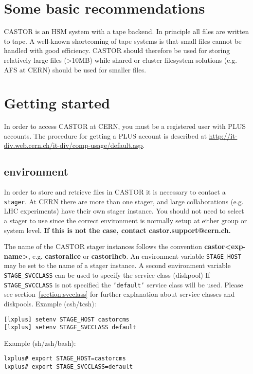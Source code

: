\section{Some basic recommendations}
CASTOR is an HSM system with a tape backend. In principle all files are written to tape. A
well-known shortcoming of tape systems is that small files cannot be handled with good efficiency.
CASTOR should therefore be used for storing relatively large files (>10MB) while shared or cluster
filesystem solutions (e.g. AFS at CERN) should be used for smaller files.

\section{Getting started}
In order to access CASTOR at CERN, you must be a registered user with PLUS accounts. The procedure
for getting a PLUS account is described at \url{http://it-div.web.cern.ch/it-div/comp-usage/default.asp}.

\subsection{environment}
\label{overview:environment}
In order to store and retrieve files in CASTOR it is necessary to contact a {\tt stager}.
At CERN there are more than one stager, and large collaborations (e.g. LHC experiments) have
their own stager instance. You should not need to select a stager to use since the correct
environment is normally setup at either group or system level.
{\bf If this is not the case, contact castor.support@cern.ch.}

The name of the CASTOR stager instances follows the convention {\bf castor<exp-name>}, e.g.
{\bf castoralice} or {\bf castorlhcb}. An environment variable {\tt STAGE\_HOST} may be set
to the name of a stager instance.
A second environment variable {\tt STAGE\_SVCCLASS} can be used to specify the service class (diskpool)
If {\tt STAGE\_SVCCLASS} is not specified the {\tt 'default'} service class will be used.
Please see section~\ref{section:svcclass} for further explanation about service classes and diskpools.
Example (csh/tcsh):
\small
\begin{verbatim}
[lxplus] setenv STAGE_HOST castorcms
[lxplus] setenv STAGE_SVCCLASS default
\end{verbatim}
\normalsize
Example (sh/zsh/bash):
\small
\begin{verbatim}
lxplus# export STAGE_HOST=castorcms
lxplus# export STAGE_SVCCLASS=default
\end{verbatim}
\normalsize

